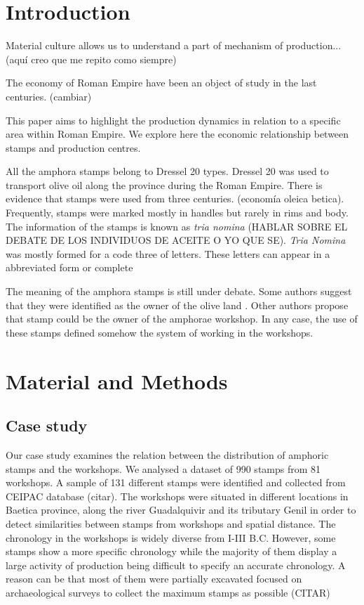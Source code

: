 \documentclass[review]{elsarticle}
\begin{document}
\section{Introduction}


Material culture allows us to understand a part of mechanism of production... (aquí creo que me repito como siempre)


The economy of Roman Empire have been an object of study in the last centuries. (cambiar)

This paper aims to highlight the production dynamics in relation to a specific area within Roman Empire. We explore here the economic relationship between stamps and production centres.  



All the amphora stamps belong to Dressel 20 types. Dressel 20 was used to transport olive oil along the province during the Roman Empire. There is evidence that stamps were used from three centuries. (economía oleica betica). Frequently, stamps were marked mostly in handles but rarely in rims and body.  
The information of the stamps is known as \textit{tria nomina} (HABLAR SOBRE EL DEBATE DE LOS INDIVIDUOS DE ACEITE O YO QUE SE). \textit{Tria Nomina} was mostly formed for a code three of letters. These letters can appear in a abbreviated form or complete \citep{berni_millet_amphora_1996}

The meaning of the amphora stamps is still under debate. Some authors suggest that they were identified as the owner of the olive land \citep{rodriguez_economioleicola_1977}. Other authors propose that stamp could be the owner of the amphorae workshop. In any case, the use of these stamps defined somehow the system of working in the workshops. 

\section{Material and Methods}

\subsection{Case study}

Our case study examines the relation between the distribution of amphoric stamps and the workshops. We analysed a dataset of 990 stamps from 81 workshops. A sample of 131 different stamps were identified and collected from CEIPAC database (citar). The workshops were situated in different locations in Baetica province, along the river Guadalquivir and its tributary Genil in order to detect similarities between stamps from workshops and spatial distance. The chronology in the workshops is widely diverse from I-III B.C. However, some stamps show a more specific chronology while the majority of them display a large activity of production being difficult to specify an accurate chronology. A reason can be that most of them were partially excavated focused on archaeological surveys to collect the maximum stamps as possible (CITAR) 
\end{document}
